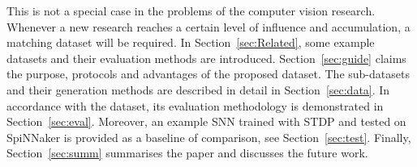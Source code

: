 This is not a special case in the problems of the computer vision research.
Whenever a new research reaches a certain level of influence and accumulation, a matching dataset will be required.
In Section~\ref{sec:Related}, some example datasets and their evaluation methods are introduced.
Section~\ref{sec:guide} claims the purpose, protocols and advantages of the proposed dataset.
The sub-datasets and their generation methods are described in detail in Section~\ref{sec:data}.
In accordance with the dataset, its evaluation methodology is demonstrated in Section~\ref{sec:eval}.
Moreover, an example SNN trained with STDP and tested on SpiNNaker is provided as a baseline of comparison, see Section~\ref{sec:test}.
Finally, Section~\ref{sec:summ} summarises the paper and discusses the future work.